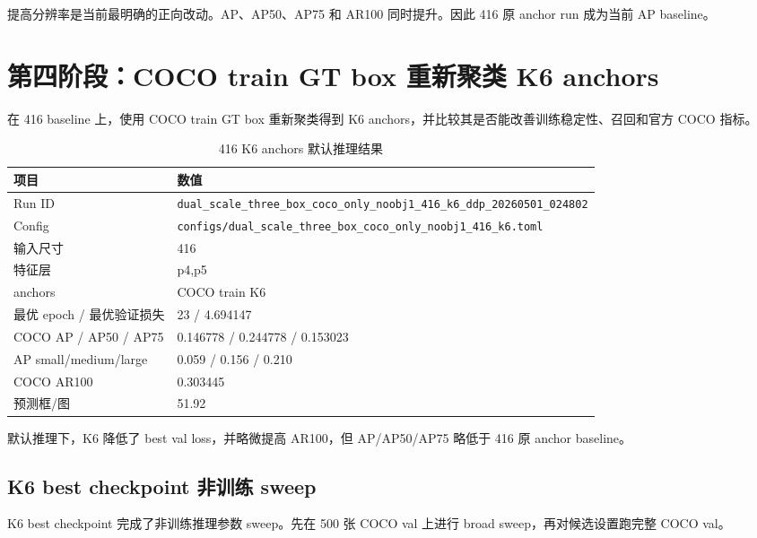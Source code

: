 \documentclass[11pt,a4paper]{article}
\begin{document}
\begin{CJK*}{UTF8}{gbsn}
提高分辨率是当前最明确的正向改动。AP、AP50、AP75 和 AR100 同时提升。因此 416 原 anchor run 成为当前 AP baseline。

\section{第四阶段：COCO train GT box 重新聚类 K6 anchors}

在 416 baseline 上，使用 COCO train GT box 重新聚类得到 K6 anchors，并比较其是否能改善训练稳定性、召回和官方 COCO 指标。

\begin{table}[H]
  \centering
  \caption{416 K6 anchors 默认推理结果}
  \label{tab:k6-default}
  \begin{tabular}{ll}
    \toprule
    项目 & 数值 \\
    \midrule
    Run ID & \texttt{dual\_scale\_three\_box\_coco\_only\_noobj1\_416\_k6\_ddp\_20260501\_024802} \\
    Config & \texttt{configs/dual\_scale\_three\_box\_coco\_only\_noobj1\_416\_k6.toml} \\
    输入尺寸 & 416 \\
    特征层 & p4,p5 \\
    anchors & COCO train K6 \\
    最优 epoch / 最优验证损失 & 23 / 4.694147 \\
    COCO AP / AP50 / AP75 & 0.146778 / 0.244778 / 0.153023 \\
    AP small/medium/large & 0.059 / 0.156 / 0.210 \\
    COCO AR100 & 0.303445 \\
    预测框/图 & 51.92 \\
    \bottomrule
  \end{tabular}
\end{table}

默认推理下，K6 降低了 best val loss，并略微提高 AR100，但 AP/AP50/AP75 略低于 416 原 anchor baseline。

\subsection{K6 best checkpoint 非训练 sweep}

K6 best checkpoint 完成了非训练推理参数 sweep。先在 500 张 COCO val 上进行 broad sweep，再对候选设置跑完整 COCO val。


\end{CJK*}
\end{document}
